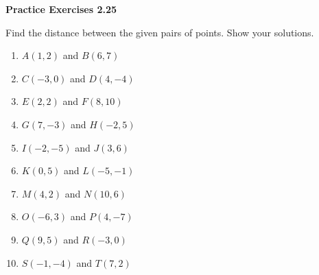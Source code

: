 \vspace{0.3ex}
\noindent\textbf{Practice Exercises 2.25}

\vspace{0.2ex}

Find the distance between the given pairs of points. Show your solutions.
\begin{multicols}{2}
\begin{enumerate}
    \item $A(1,2)$ and $B(6,7)$
    \item $C(-3,0)$ and $D(4,-4)$
    \item $E(2,2)$ and $F(8,10)$
    \item $G(7,-3)$ and $H(-2,5)$
    \item $I(-2,-5)$ and $J(3,6)$
    \item $K(0,5)$ and $L(-5,-1)$
    \item $M(4,2)$ and $N(10,6)$
    \item $O(-6,3)$ and $P(4,-7)$
    \item $Q(9,5)$ and $R(-3,0)$
    \item $S(-1,-4)$ and $T(7,2)$
\end{enumerate}
\end{multicols}
